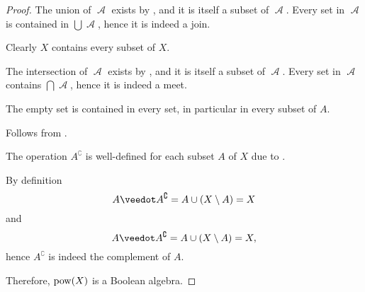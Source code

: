 \begin{proof}
   The union of \( \mscrA \) exists by , and it is itself a subset of \( \mscrA \). Every set in \( \mscrA \) is contained in \( \bigcup \mscrA \), hence it is indeed a join.

   Clearly \( X \) contains every subset of \( X \).

   The intersection of \( \mscrA \) exists by , and it is itself a subset of \( \mscrA \). Every set in \( \mscrA \) contains \( \bigcap \mscrA \), hence it is indeed a meet.

   The empty set is contained in every set, in particular in every subset of \( A \).

   Follows from .

   The operation \( A^\complement \) is well-defined for each subset \( A \) of \( X \) due to .

  By definition
  \begin{equation*}
    A \synvee A^\complement
    =
    A \cup (X \setminus A)
    =
    X
  \end{equation*}
  and
  \begin{equation*}
    A \synvee A^\complement
    =
    A \cup (X \setminus A)
    =
    X,
  \end{equation*}
  hence \( A^\complement \) is indeed the complement of \( A \).

  Therefore, \( \operatorname{pow}(X) \) is a Boolean algebra.
\end{proof}

